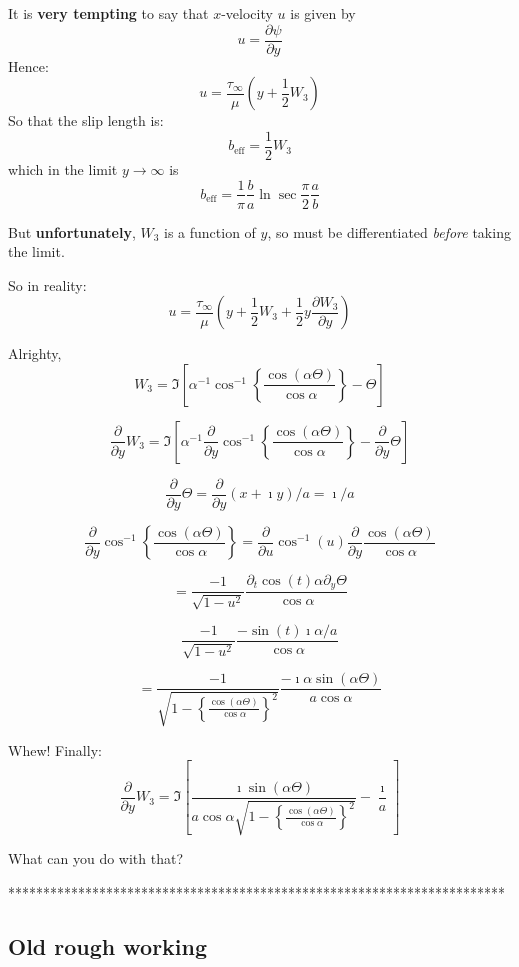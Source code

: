 \documentclass{article}
\begin{document}
It is \textbf{very tempting} to say that $x$-velocity $u$ is given by
\[ u = \frac{\partial \psi}{\partial y} \]
Hence:
\[ u = \frac{\tau_{\infty}}{\mu} \left( y
            + \frac{1}{2} W_{3} \right)  \]
So that the slip length is:
\[ b_{\mathrm{eff}} = \frac{1}{2} W_{3}\]
which in the limit $y \rightarrow \infty$ is 
\[ b_{\mathrm{eff}} = \frac{1}{\pi} \frac{b}{a} \ln \sec \frac{\pi}{2} \frac{a}{b} \]

But \textbf{unfortunately}, $W_{3}$ is a function of $y$, so must be differentiated \emph{before} taking the limit.

So in reality:
\[ u = \frac{\tau_{\infty}}{\mu} \left( y
            + \frac{1}{2} W_{3}
            + \frac{1}{2} y \frac{\partial W_{3}}{\partial y} \right) \]

Alrighty,
\[ W_{3} = \Im \left[  
 \alpha^{-1} \cos^{-1} 
 \left\{ \frac{\cos(\alpha \Theta)}{\cos \alpha} \right\} - \Theta
   \right] \]

\[ \frac{\partial}{\partial y} W_{3} = \Im \left[  
 \alpha^{-1}  \frac{\partial}{\partial y}  \cos^{-1} 
 \left\{ \frac{\cos(\alpha \Theta)}{\cos \alpha} \right\}
  - \frac{\partial}{\partial y} \Theta
   \right] \]

\[ \frac{\partial}{\partial y} \Theta = \frac{\partial}{\partial y} (x + \imath y)/a
    = \imath / a  \]
    
\[ \frac{\partial}{\partial y}  \cos^{-1} 
 \left\{ \frac{\cos(\alpha \Theta)}{\cos \alpha} \right\}
 = \frac{\partial}{\partial u} \cos^{-1}( u ) 
   \frac{\partial}{\partial y}  \frac{\cos(\alpha \Theta)}{\cos \alpha} \]

\[ = \frac{-1}{\sqrt{1-u^{2}}}  \frac{ \partial_{t} \cos(t) \alpha \partial_{y} \Theta}{\cos \alpha}  \]

\[  \frac{-1}{\sqrt{1-u^{2}}}  \frac{-\sin(t) \imath \alpha/a}{\cos \alpha} \]

\[ =  \frac{-1}{\sqrt{1-
\left\{ \frac{\cos(\alpha \Theta)}{\cos \alpha} \right\}^{2}}} 
     \frac{- \imath \alpha \sin(\alpha \Theta)}{a \cos \alpha} \]
     
Whew! Finally:
\[ \frac{\partial}{\partial y} W_{3} = \Im \left[  
\frac{\imath \sin(\alpha \Theta)}
{ a \cos \alpha
\sqrt{1- \left\{ \frac{\cos(\alpha \Theta)}{\cos \alpha} \right\}^{2}}} 
 - \frac{\imath}{a}   \right] \]

What can you do with that?

\pagebreak

***********************************************************************
\subsection*{Old rough working}
\end{document}
